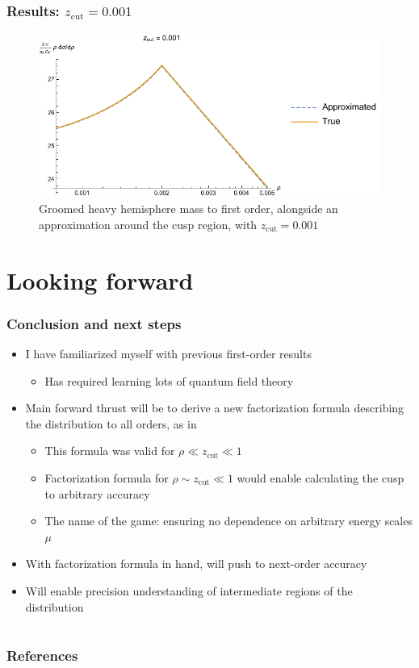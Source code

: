 \documentclass{beamer}
\newcommand{\zcut}{z_\mathrm{cut}}
\begin{document}
	\begin{frame}
		\frametitle{Results: $\zcut = 0.001$}

		\begin{figure}
			\includegraphics[width=\columnwidth]{figures/approximation_small_zcut_zoomed.pdf}
			\caption{Groomed heavy hemisphere mass to first order, alongside an approximation around the cusp region, with $\zcut = 0.001$}
		\end{figure}
	\end{frame}


\section{Looking forward}
	\begin{frame}
		\frametitle{Conclusion and next steps}

		\begin{itemize}
			\item I have familiarized myself with previous first-order results
			\begin{itemize}
				\item Has required learning lots of quantum field theory
			\end{itemize}

			\item Main forward thrust will be to derive a new factorization formula describing the distribution to all orders, as in \cite{frye_factorization_2016-1}
			\begin{itemize}
				\item This formula was valid for $\rho \ll \zcut \ll 1$

				\item Factorization formula for $\rho \sim \zcut \ll 1$ would enable calculating the cusp to arbitrary accuracy

				\item The name of the game: ensuring no dependence on arbitrary energy scales $\mu$
			\end{itemize}

			\item With factorization formula in hand, will push to next-order accuracy

			\item Will enable precision understanding of intermediate regions of the distribution
		\end{itemize}
	\end{frame}

\section*{}
    \begin{frame}[allowframebreaks]
        \frametitle{References}
        
        
    \end{frame}
\end{document}
